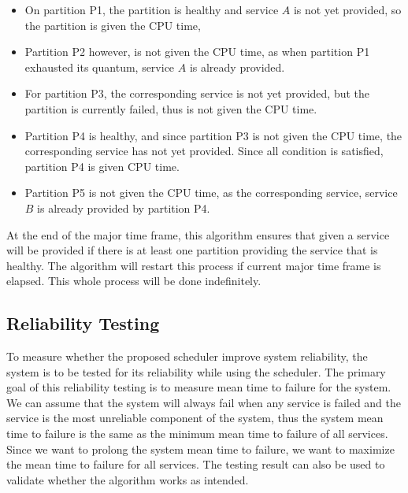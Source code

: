 \begin{itemize}

	\item On partition P1, the partition is healthy and service $A$ is not yet provided, so
		the partition is given the CPU time,

	\item Partition P2 however, is not given the CPU time, as when partition P1 exhausted
		its quantum, service $A$ is already provided.

	\item For partition P3, the corresponding service is not yet provided, but the partition
		is currently failed, thus is not given the CPU time.

	\item Partition P4 is healthy, and since partition P3 is not given the CPU time, the
		corresponding service has not yet provided. Since all condition is satisfied,
		partition P4 is given CPU time.

	\item Partition P5 is not given the CPU time, as the corresponding service, service $B$
		is already provided by partition P4.

\end{itemize}

At the end of the major time frame, this algorithm ensures that given a service will be provided
if there is at least one partition providing the service that is healthy. The algorithm will
restart this process if current major time frame is elapsed. This whole process will be done
indefinitely.

\subsection{Reliability Testing}

To measure whether the proposed scheduler improve system reliability, the system is to be tested
for its reliability while using the scheduler. The primary goal of this reliability testing is
to measure mean time to failure for the system. We can assume that the system will always fail
when any service is failed and the service is the most unreliable component of the system, thus
the system mean time to failure is the same as the minimum mean time to failure of all services.
Since we want to prolong the system mean time to failure, we want to maximize the mean time to
failure for all services. The testing result can also be used to validate whether the algorithm
works as intended.


